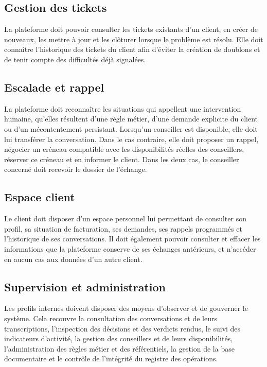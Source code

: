 \subsection{Gestion des tickets}

La plateforme doit pouvoir consulter les tickets existants d'un client, en créer de nouveaux, les mettre à jour et les clôturer lorsque le problème est résolu. Elle doit connaître l'historique des tickets du client afin d'éviter la création de doublons et de tenir compte des difficultés déjà signalées.

\subsection{Escalade et rappel}

La plateforme doit reconnaître les situations qui appellent une intervention humaine, qu'elles résultent d'une règle métier, d'une demande explicite du client ou d'un mécontentement persistant. Lorsqu'un conseiller est disponible, elle doit lui transférer la conversation. Dans le cas contraire, elle doit proposer un rappel, négocier un créneau compatible avec les disponibilités réelles des conseillers, réserver ce créneau et en informer le client. Dans les deux cas, le conseiller concerné doit recevoir le dossier de l'échange.

\subsection{Espace client}

Le client doit disposer d'un espace personnel lui permettant de consulter son profil, sa situation de facturation, ses demandes, ses rappels programmés et l'historique de ses conversations. Il doit également pouvoir consulter et effacer les informations que la plateforme conserve de ses échanges antérieurs, et n'accéder en aucun cas aux données d'un autre client.

\subsection{Supervision et administration}

Les profils internes doivent disposer des moyens d'observer et de gouverner le système. Cela recouvre la consultation des conversations et de leurs transcriptions, l'inspection des décisions et des verdicts rendus, le suivi des indicateurs d'activité, la gestion des conseillers et de leurs disponibilités, l'administration des règles métier et des référentiels, la gestion de la base documentaire et le contrôle de l'intégrité du registre des opérations.


